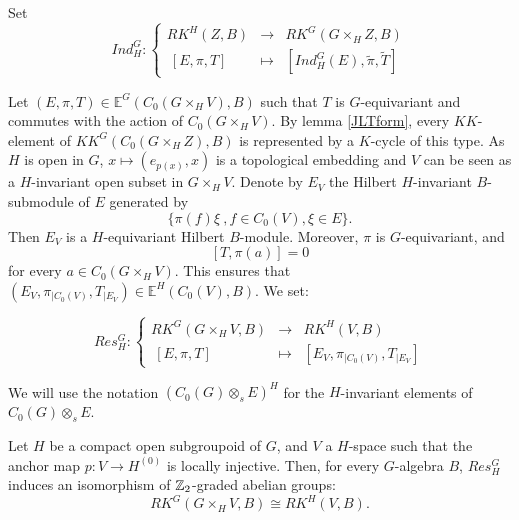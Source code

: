 Set
\[Ind_H^G :
\left\{\begin{array}{rcl} 
RK^H(Z,B) & \rightarrow & RK^G(G\times_H Z,B) \\
\ [E,\pi,T ] & \mapsto & [ Ind_H^G (E), \tilde \pi, \tilde T ] \end{array} \right.\]

Let $(E,\pi,T)\in \mathbb E^G(C_0(G\times_H V),B)$ such that $T$ is $G$-equivariant and commutes with the action of $C_0(G\times_H V)$. By lemma \ref{JLTform}, every $KK$-element of $KK^G(C_0(G\times_H Z),B)$ is represented by a $K$-cycle of this type.  As $H$ is open in $G$, $x\mapsto (e_{p(x)},x)$ is a topological embedding and $V$ can be seen as a $H$-invariant open subset in $G\times_H V$. Denote by $E_V$ the Hilbert $H$-invariant $B$-submodule of $E$ generated by 
\[\{\pi(f)\xi \ ,f\in C_0(V), \xi\in E\}.\]
Then $E_{V}$ is a $H$-equivariant Hilbert $B$-module. Moreover, $\pi$ is $G$-equivariant, and \[[T,\pi(a)]=0\] for every $a\in C_0(G\times_H V)$. This ensures that $(E_V,\pi_{|C_0(V)}, T_{|E_V}) \in \mathbb E^H(C_0(V),B)$. We set:

\[Res_H^G :
\left\{\begin{array}{rcl} 
 RK^G(G\times_H V,B) & \rightarrow & RK^H(V,B) \\
\ [E,\pi,T ] & \mapsto & [ E_V,\pi_{|C_0(V)}, T_{|E_V} ] \end{array} \right.\]

We will use the notation $\left( C_0(G)\otimes_s E \right)^H$ for the $H$-invariant elements of $C_0(G)\otimes_s E$.

\begin{lem} \label{Restriction} Let $H$ be a compact open subgroupoid of $G$, and $V$ a $H$-space such that the anchor map 
$p : V\rightarrow H^{(0)}$ is locally injective. Then, for every $G$-algebra $B$, $Res_H^G$ induces an isomorphism of $\mathbb Z_2$-graded abelian groups:
\[RK^G( G\times_H V, B) \cong RK^H(V, B).\]
\end{lem}

